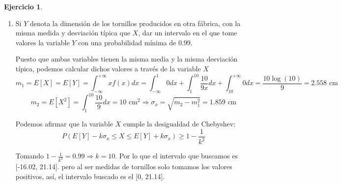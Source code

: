\documentclass[a4paper, 12pt]{article}
\theoremstyle{definition}
\newtheorem{ej}{Ejercicio}
\begin{document}
\begin{ej}
\begin{enumerate}[label=\alph*)]
	\item Si \(Y\) denota la dimensión de los tornillos producidos en otra fábrica, con la misma medida y desviación típica que \(X\), dar un intervalo en el que tome valores la variable \(Y\) con una probabilidad mínima de 0.99.
	
Puesto que ambas variables tienen la misma media y la misma desviación típica, podemos calcular dichos valores a través de la variable \(X\)
\[
	m_1 = E[X] = E[Y] = \int_{- \infty}^{+ \infty} xf(x)dx = \int_{-\infty}^{1} 0dx + \int_{1}^{10} \frac{10}{9x} dx + \int_{10}^{+ \infty} 0dx = \frac{10 \log (10)}{9} = 2.558 \text{ cm}
\]
\[
	m_2 = E[X^2] = \int_{1}^{10} \frac{10}{9} dx = 10 \text{ cm}^2 \Rightarrow \sigma_x = \sqrt{m_2 - m_1^2} = 1.859 \text{ cm}
\]

Podemos afirmar que la variable \(X\) cumple la desigualdad de Chebyshev:
\[
	P(E[Y] - k \sigma_x \leq X \leq E[Y] + k \sigma_x) \geq 1 - \frac{1}{k^2}
\]

Tomando \(1 - \frac{1}{k^2} = 0.99 \Rightarrow k = 10\). Por lo que el intervalo que buscamos es [-16.02, 21.14]. pero al ser medidas de tornillos solo tomamos los valores positivos, así, el intervalo buscado es el [0, 21.14].
\end{enumerate}

\end{ej}
\end{document}
